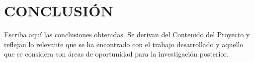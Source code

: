 \section*{CONCLUSIÓN}
\justifying

Escriba aquí las conclusiones obtenidas. Se derivan del Contenido del Proyecto y reflejan lo relevante que se ha encontrado con el trabajo desarrollado y aquello que se considera son áreas de oportunidad para la investigación posterior.